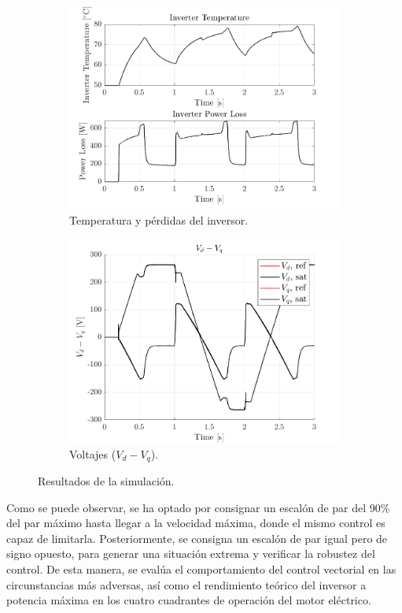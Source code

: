 \begin{figure}[H]
    \begin{subfigure}{0.4\textwidth}
        \includegraphics[width=\linewidth]{fig/PLECS_thermal.png}
        \caption{Temperatura y pérdidas del inversor.}
    \end{subfigure}
    \begin{subfigure}{0.4\textwidth}
        \includegraphics[width=\linewidth]{fig/PLECS_vdvq.png}
        \caption{Voltajes ($V_{d} - V_{q}$).}
    \end{subfigure}

    \caption{Resultados de la simulación.}
\end{figure}

Como se puede observar, se ha optado por consignar un escalón de par del 90\% del par máximo hasta llegar a la velocidad máxima, donde el mismo control es capaz de limitarla. Posteriormente, se consigna un escalón de par igual pero de signo opuesto, para generar una situación extrema y verificar la robustez del control. De esta manera, se evalúa el comportamiento del control vectorial en las circunstancias más adversas, así como el rendimiento teórico del inversor a potencia máxima en los cuatro cuadrantes de operación del motor eléctrico.

